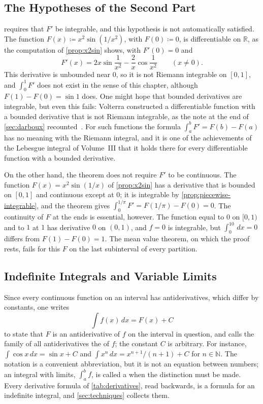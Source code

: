 \subsection{The Hypotheses of the Second Part}

 requires that $F'$ be integrable, and this hypothesis is not automatically satisfied. The function $F(x)\coloneqq x^2\sin(1/x^2)$, with $F(0)\coloneqq0$, is differentiable on $\mathbb R$, as the computation of \cref{prop:x2sin} shows, with $F'(0)=0$ and
\[
F'(x)=2x\sin\frac1{x^2}-\frac2x\cos\frac1{x^2}\qquad(x\ne0).
\]
This derivative is unbounded near $0$, so it is not Riemann integrable on $[0,1]$, and $\int_0^1F'$ does not exist in the sense of this chapter, although $F(1)-F(0)=\sin1$ does. One might hope that bounded derivatives are integrable, but even this fails: Volterra constructed a differentiable function with a bounded derivative that is not Riemann integrable, as the note at the end of \cref{sec:darboux} recounted~\cite{volterra1881}. For such functions the formula $\int_a^bF'=F(b)-F(a)$ has no meaning with the Riemann integral, and it is one of the achievements of the Lebesgue integral of Volume~III that it holds there for every differentiable function with a bounded derivative.

On the other hand, the theorem does not require $F'$ to be continuous. The function $F(x)=x^2\sin(1/x)$ of \cref{prop:x2sin} has a derivative that is bounded on $[0,1]$ and continuous except at $0$; it is integrable by \cref{prop:piecewise-integrable}, and the theorem gives $\int_0^{1/\pi}F'=F(1/\pi)-F(0)=0$. The continuity of $F$ at the ends is essential, however. The function equal to $0$ on $[0,1)$ and to $1$ at $1$ has derivative $0$ on $(0,1)$, and $f=0$ is integrable, but $\int_0^10\,dx=0$ differs from $F(1)-F(0)=1$. The mean value theorem, on which the proof rests, fails for this $F$ on the last subinterval of every partition.

\subsection{Indefinite Integrals and Variable Limits}

Since every continuous function on an interval has antiderivatives, which differ by constants, one writes
\[
\int f(x)\,dx=F(x)+C
\]
to state that $F$ is an antiderivative of $f$ on the interval in question, and calls the family of all antiderivatives the  of $f$; the constant $C$ is arbitrary. For instance, $\int\cos x\,dx=\sin x+C$ and $\int x^n\,dx=x^{n+1}/(n+1)+C$ for $n\in\mathbb N$. The notation is a convenient abbreviation, but it is not an equation between numbers; an integral with limits, $\int_a^bf$, is called a  when the distinction must be made. Every derivative formula of \cref{tab:derivatives}, read backwards, is a formula for an indefinite integral, and \cref{sec:techniques} collects them.

